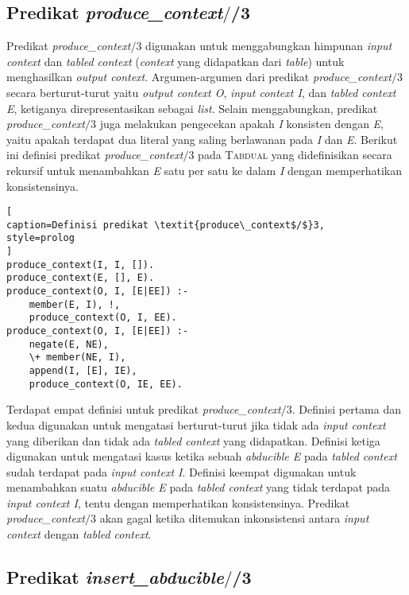 \subsection{Predikat \textit{produce\_context$/$}/3}

Predikat \textit{produce\_context$/$}3 digunakan untuk menggabungkan himpunan \textit{input context} dan \textit{tabled context} (\textit{context} yang didapatkan dari \textit{table}) untuk menghasilkan \textit{output context}. Argumen-argumen dari predikat \textit{produce\_context$/$}3 secara berturut-turut yaitu \textit{output context O}, \textit{input context I}, dan \textit{tabled context E}, ketiganya direpresentasikan sebagai \textit{list}. Selain menggabungkan, predikat \textit{produce\_context$/$}3 juga melakukan pengecekan apakah \textit{I} konsisten dengan \textit{E}, yaitu apakah terdapat dua literal yang saling berlawanan pada \textit{I} dan \textit{E}. Berikut ini definisi predikat \textit{produce\_context$/$}3 pada \textsc{Tabdual} yang didefinisikan secara rekursif untuk menambahkan \textit{E} satu per satu ke dalam \textit{I} dengan memperhatikan konsistensinya.
\\

\begin{lstlisting}[
caption=Definisi predikat \textit{produce\_context$/$}3,
style=prolog
]
produce_context(I, I, []).
produce_context(E, [], E).
produce_context(O, I, [E|EE]) :-
	member(E, I), !,
	produce_context(O, I, EE).
produce_context(O, I, [E|EE]) :-
	negate(E, NE),
	\+ member(NE, I),
	append(I, [E], IE),
	produce_context(O, IE, EE).
\end{lstlisting}

Terdapat empat definisi untuk predikat \textit{produce\_context$/$}3. Definisi pertama dan kedua digunakan untuk mengatasi berturut-turut jika tidak ada \textit{input context} yang diberikan dan tidak ada \textit{tabled context} yang didapatkan. Definisi ketiga digunakan untuk mengatasi kasus ketika sebuah \textit{abducible E} pada \textit{tabled context} sudah terdapat pada \textit{input context I}. Definisi keempat digunakan untuk menambahkan suatu \textit{abducible E} pada \textit{tabled context} yang tidak terdapat pada \textit{input context I}, tentu dengan memperhatikan konsistensinya. Predikat \textit{produce\_context$/$}3 akan gagal ketika ditemukan inkonsistensi antara \textit{input context} dengan \textit{tabled context}.

\subsection{Predikat \textit{insert\_abducible$/$}/3}

